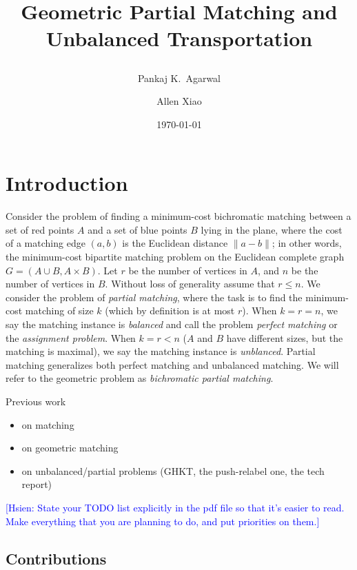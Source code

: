 \documentclass[11pt]{article}
\title{ Geometric Partial Matching and Unbalanced Transportation %
\date{\today} %
\author{
Pankaj K.\ Agarwal
\and
Allen Xiao
}
}
\theoremstyle{plain}
\begin{document}
\maketitle

\section{Introduction}

Consider the problem of finding a minimum-cost bichromatic matching between
a set of red points $A$ and a set of blue points $B$ lying in the plane,
where the cost of a matching edge $(a, b)$ is the Euclidean distance
$\|a - b\|$;
in other words, the minimum-cost bipartite matching problem on the Euclidean
complete graph $G = (A \cup B, A \times B)$.
Let $r$ be the number of vertices in $A$, and $n$ be the number of vertices in $B$.
Without loss of generality assume that $r \leq n$.
We consider the problem of \emph{partial matching}, where the task is to
find the minimum-cost matching of size $k$ (which by definition is at most $r$).
When $k = r = n$, we say the matching instance is \emph{balanced}
and call the problem \emph{perfect matching} or the \emph{assignment problem}.
When $k = r < n$ ($A$ and $B$ have different sizes, but the matching is
maximal), we say the matching instance is \emph{unblanced}.
Partial matching generalizes both perfect matching and unbalanced matching.
We will refer to the geometric problem as \emph{bichromatic partial matching}.

\begin{TODO}
Previous work
\begin{itemize}\itemsep=0pt
	\item on matching
	\item on geometric matching
	\item on unbalanced/partial problems (GHKT, the push-relabel one, the tech report)
\end{itemize}
\noindent\textcolor{blue}{[Hsien: State your TODO list explicitly in the pdf file so that it's easier to read.  Make everything that you are planning to do, and put priorities on them.]}
\end{TODO}


\subsection{Contributions}
\end{document}

